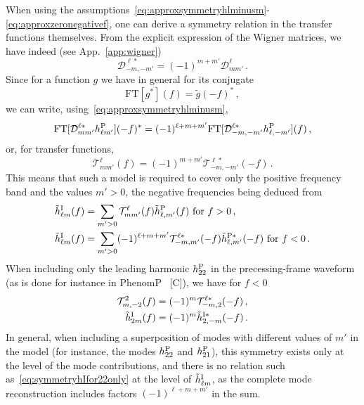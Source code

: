 \documentclass[aps,showpacs,twocolumn,
prd,superscriptaddress,nofootinbib]{revtex4-1}
\newcommand{\be}{\begin{equation}}
\newcommand{\ee}{\end{equation}}
\newcommand\calT{{\mathcal{T}}}
\newcommand\calD{{\mathcal{D}}}
\newcommand{\nn}{\nonumber}
\newcommand{\SM}[1]{{\color{Red} #1}}
\begin{document}
When using the assumptions~\eqref{eq:approxsymmetryhlminusm}-\eqref{eq:approxzeronegativef}, one can derive a symmetry relation in the transfer functions themselves. From the explicit expression of the Wigner matrices, we have indeed (see App.~\ref{app:wigner})
\be
	\calD^{\ell *}_{-m,-m'} = (-1)^{m+m'}\calD^{\ell}_{mm'} \,.
\ee
Since for a function $g$ we have in general for its conjugate
\be
	\mathrm{FT}[g^{*}](f) = \tilde{g}(-f)^{*} \,,
\ee
we can write, using~\eqref{eq:approxsymmetryhlminusm},
\be
	\mathrm{FT}[\calD^{\ell *}_{mm'} h_{\ell m'}^{\rm P}](-f)^{*} = (-1)^{\ell+m+m'} \mathrm{FT}[\calD^{\ell *}_{-m,-m'} h_{\ell, -m'}^{\rm P}](f) \,,
\ee
or, for transfer functions,
\be
	\calT^{\ell}_{mm'}(f) = (-1)^{m+m'} \calT^{\ell *}_{-m,-m'}(-f) \,.
\ee
This means that such a model is required to cover only the positive frequency band and the values $m'>0$, the negative frequencies being deduced from
\begin{align}
	\tilde{h}^{\rm I}_{\ell m}(f) &= \sum_{m'>0} \calT^{\ell}_{mm'}(f) \tilde{h}^{\rm P}_{\ell, m'}(f) \text{ for } f>0 \,, \nn\\
	\tilde{h}^{\rm I}_{\ell m}(f) &= \sum_{m'>0} (-1)^{\ell+m+m'} \calT^{\ell *}_{-m,m'}(-f) \tilde{h}^{\rm P *}_{\ell, m'}(-f) \text{ for } f<0 \,.
\end{align}
When including only the leading harmonic $h^{\rm P}_{22}$ in the precessing-frame waveform (as is done for instance in PhenomP~\cite{} \SM{[C]}), we have for $f<0$
\begin{subequations}
\begin{align}
	\calT^{2}_{m,-2}(f) &= (-1)^{m} \calT^{\ell *}_{-m,2}(-f) \,, \\
	\tilde{h}^{\rm I}_{2 m}(f) &= (-1)^{m} \tilde{h}^{\rm I *}_{2,-m}(-f) \,. \label{eq:symmetryhIfor22only}
\end{align}
\end{subequations}
In general, when including a superposition of modes with different values of $m'$ in the model (for instance, the modes $h^{\rm P}_{22}$ and $h^{\rm P}_{21}$), this symmetry exists only at the level of the mode contributions, and there is no relation such as~\eqref{eq:symmetryhIfor22only}  at the level of $\tilde{h}^{\rm I}_{\ell m}$, as the complete mode reconstruction includes factors $(-1)^{\ell+m+m'}$ in the sum.
\end{document}
